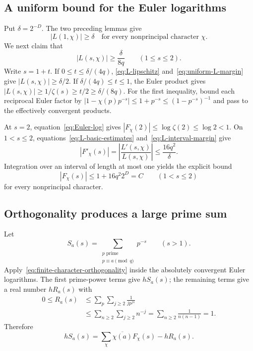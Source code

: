 \subsection{A uniform bound for the Euler logarithms}

Put $\delta=2^{-D}$.  The two preceding lemmas give
\begin{equation}
 |L(1,\chi)|\geq\delta
 \quad\text{for every nonprincipal character }\chi.
 \label{eq:uniform-L-margin}
\end{equation}
We next claim that
\begin{equation}
 |L(s,\chi)|\geq\frac\delta{8q}
 \qquad(1\leq s\leq2).
 \label{eq:L-interval-margin}
\end{equation}
Write $s=1+t$.  If $0\leq t\leq\delta/(4q)$,
\eqref{eq:L-lipschitz} and~\eqref{eq:uniform-L-margin} give
$|L(s,\chi)|\geq\delta/2$.  If $\delta/(4q)\leq t\leq1$, the Euler product
gives $|L(s,\chi)|\geq1/\zeta(s)\geq t/2\geq\delta/(8q)$.
For the first inequality, bound each reciprocal Euler factor by
$|1-\chi(p)p^{-s}|\leq1+p^{-s}\leq(1-p^{-s})^{-1}$ and pass to the
effectively convergent products.

At $s=2$, equation~\eqref{eq:Euler-log} gives
$|F_\chi(2)|\leq\log\zeta(2)\leq\log2<1$.  On $1<s\leq2$,
equations~\eqref{eq:L-basic-estimates} and~\eqref{eq:L-interval-margin} give
\[
 |F'_\chi(s)|=\left|\frac{L'(s,\chi)}{L(s,\chi)}\right|
       \leq\frac{16q^2}{\delta}.
\]
Integration over an interval of length at most one yields the explicit bound
\begin{equation}
 |F_\chi(s)|\leq1+16q^2 2^D=C
 \qquad(1<s\leq2)
 \label{eq:Euler-log-bound}
\end{equation}
for every nonprincipal character.

\subsection{Orthogonality produces a large prime sum}

Let
\[
 S_a(s)=\sum_{\substack{p\text{ prime}\\p\equiv a\pmod q}}p^{-s}
 \qquad(s>1).
\]
Apply~\eqref{eq:finite-character-orthogonality} inside the absolutely
convergent Euler logarithms.  The first prime-power terms give $hS_a(s)$;
the remaining terms give a real number $hR_a(s)$ with
\begin{align*}
 0\leq R_a(s)
 &\leq\sum_p\sum_{j\geq2}\frac1{j p^{js}}\\
 &\leq\sum_{n\geq2}\sum_{j\geq2}n^{-j}
   =\sum_{n\geq2}\frac1{n(n-1)}=1.
\end{align*}
Therefore
\begin{equation}
 hS_a(s)=\sum_\chi\overline{\chi(a)}F_\chi(s)-hR_a(s).
 \label{eq:prime-log-orthogonality}
\end{equation}


